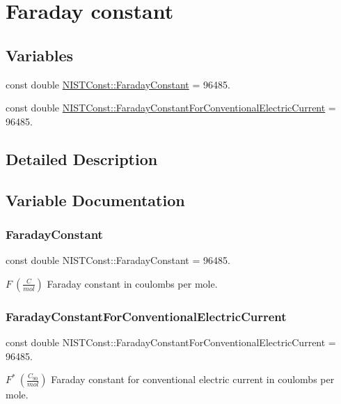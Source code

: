 \hypertarget{group___faraday_constant}{}\section{Faraday constant}
\label{group___faraday_constant}
\subsection*{Variables}
\begin{DoxyCompactItemize}
\item 
const double \hyperlink{group___faraday_constant_ga3a2104c5d85a6e687d615ec8004aa4c5}{N\+I\+S\+T\+Const\+::\+Faraday\+Constant} = 96485.
\item 
const double \hyperlink{group___faraday_constant_ga06079db2ebfcb103460b80a977171ac0}{N\+I\+S\+T\+Const\+::\+Faraday\+Constant\+For\+Conventional\+Electric\+Current} = 96485.
\end{DoxyCompactItemize}


\subsection{Detailed Description}


\subsection{Variable Documentation}
\mbox{\label{group___faraday_constant_ga3a2104c5d85a6e687d615ec8004aa4c5}} 
\subsubsection{\texorpdfstring{Faraday\+Constant}{FaradayConstant}}
{\footnotesize\ttfamily const double N\+I\+S\+T\+Const\+::\+Faraday\+Constant = 96485.}

$F \ (\frac{C}{mol})$ Faraday constant in coulombs per mole. \mbox{\label{group___faraday_constant_ga06079db2ebfcb103460b80a977171ac0}} 
\subsubsection{\texorpdfstring{Faraday\+Constant\+For\+Conventional\+Electric\+Current}{FaradayConstantForConventionalElectricCurrent}}
{\footnotesize\ttfamily const double N\+I\+S\+T\+Const\+::\+Faraday\+Constant\+For\+Conventional\+Electric\+Current = 96485.}

$F^\ast \ (\frac{C_{90}}{mol})$ Faraday constant for conventional electric current in coulombs per mole. 